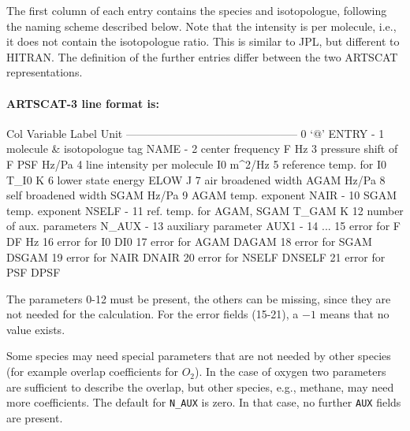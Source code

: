The first column of each entry contains the species and isotopologue,
following the naming scheme described below. Note that the intensity
is per molecule, i.e., it does not contain the isotopologue ratio. This is
similar to JPL, but different to HITRAN.
The definition of the further entries differ between the two ARTSCAT
representations.

\paragraph*{ARTSCAT-3 line format is:}
\begin{code}

Col  Variable                     Label    Unit     
-----------------------------------------------      
 0   `@'                         ENTRY        -     
 1   molecule & isotopologue tag  NAME        -
 2   center frequency                F       Hz     
 3   pressure shift of F           PSF    Hz/Pa    
 4   line intensity per molecule    I0   m^2/Hz     
 5   reference temp. for I0       T_I0        K
 6   lower state energy           ELOW        J    
 7   air broadened width          AGAM    Hz/Pa     
 8   self broadened width         SGAM    Hz/Pa
 9   AGAM temp. exponent          NAIR        -     
10   SGAM temp. exponent         NSELF        - 
11   ref. temp. for AGAM, SGAM   T_GAM        K
12   number of aux. parameters   N_AUX        -
13   auxiliary parameter          AUX1        -
14   ... 
15   error for F                    DF       Hz
16   error for I0                  DI0        %
17   error for AGAM              DAGAM        %
18   error for SGAM              DSGAM        %
19   error for NAIR              DNAIR        %
20   error for NSELF            DNSELF        %
21   error for PSF                DPSF        %

\end{code}
The parameters 0-12 must be present, the others can be missing, since
they are not needed for the calculation. For the error fields (15-21),
a $-1$ means that no value exists.

Some species may need special parameters that are not needed by other
species (for example overlap coefficients for $O_2$). In the case of
oxygen two parameters are sufficient to describe the overlap, but
other species, e.g., methane, may need more coefficients. The default
for \texttt{N\_AUX} is zero. In that case, no further \texttt{AUX}
fields are present.

